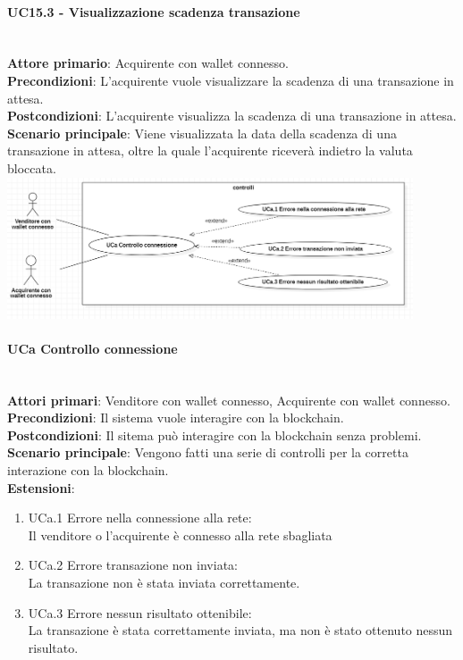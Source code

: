 \documentclass[a4paper, 12pt]{article}
\begin{document}
\paragraph{UC15.3 - Visualizzazione scadenza transazione}\\
\textbf{Attore primario}: Acquirente  con wallet connesso.\\
\textbf{Precondizioni}: L'acquirente vuole visualizzare la scadenza di una transazione in attesa.\\
\textbf{Postcondizioni}: L'acquirente visualizza la scadenza di una transazione in attesa.\\
\textbf{Scenario principale}: Viene visualizzata la data della scadenza di una transazione in attesa, oltre la quale l'acquirente riceverà indietro la valuta bloccata.\\

\includegraphics[width=0.9\textwidth]{UC_controlli}

\paragraph{UCa Controllo connessione}\\
\textbf{Attori primari}: Venditore con wallet connesso, Acquirente con wallet connesso. \\
\textbf{Precondizioni}: Il sistema vuole interagire con la blockchain.\\
\textbf{Postcondizioni}:  Il sitema può interagire con la blockchain senza problemi.\\
\textbf{Scenario principale}:
Vengono fatti una serie di controlli per la corretta interazione con la blockchain.\\
\textbf{Estensioni}:
\begin{enumerate}
    \item UCa.1 Errore nella connessione alla rete:\\
        Il venditore o l'acquirente è connesso alla rete sbagliata
    \item UCa.2 Errore transazione non inviata:\\
        La transazione non è stata inviata correttamente.
    \item UCa.3 Errore nessun risultato ottenibile:\\
        La transazione è stata correttamente inviata, ma non è stato ottenuto nessun risultato.
\end{enumerate}
\end{document}
